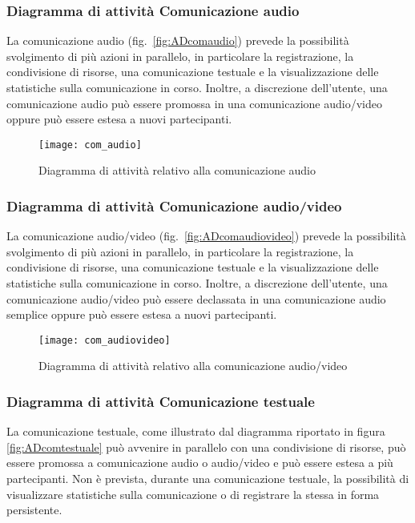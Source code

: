 \subsubsection{Diagramma di attività Comunicazione audio}
La comunicazione audio (fig.~\vref{fig:ADcomaudio}) prevede la possibilità svolgimento di più azioni in parallelo, in particolare la registrazione, la condivisione di risorse, una comunicazione testuale e la visualizzazione delle statistiche sulla comunicazione in corso. Inoltre, a discrezione dell'utente, una comunicazione audio può essere promossa in una comunicazione audio/video oppure può essere estesa a nuovi partecipanti.

\begin{figure}[H]
\centering
\texttt{[image: com\_audio]}
\caption{Diagramma di attività relativo alla comunicazione audio}\label{fig:ADcomaudio}
\end{figure}

\subsubsection{Diagramma di attività Comunicazione audio/video}
La comunicazione audio/video (fig.~\vref{fig:ADcomaudiovideo}) prevede la possibilità svolgimento di più azioni in parallelo, in particolare la registrazione, la condivisione di risorse, una comunicazione testuale e la visualizzazione delle statistiche sulla comunicazione in corso. Inoltre, a discrezione dell'utente, una comunicazione audio/video può essere declassata in una comunicazione audio semplice oppure può essere estesa a nuovi partecipanti.

\begin{figure}[H]
\centering
\texttt{[image: com\_audiovideo]}
\caption{Diagramma di attività relativo alla comunicazione audio/video}\label{fig:ADcomaudiovideo}
\end{figure}

\subsubsection{Diagramma di attività Comunicazione testuale}
La comunicazione testuale, come illustrato dal diagramma riportato in figura \vref{fig:ADcomtestuale} può avvenire in parallelo con una condivisione di risorse, può essere promossa a comunicazione audio o audio/video e può essere estesa a più partecipanti. Non è prevista, durante una comunicazione testuale, la possibilità di visualizzare statistiche sulla comunicazione o di registrare la stessa in forma persistente.

